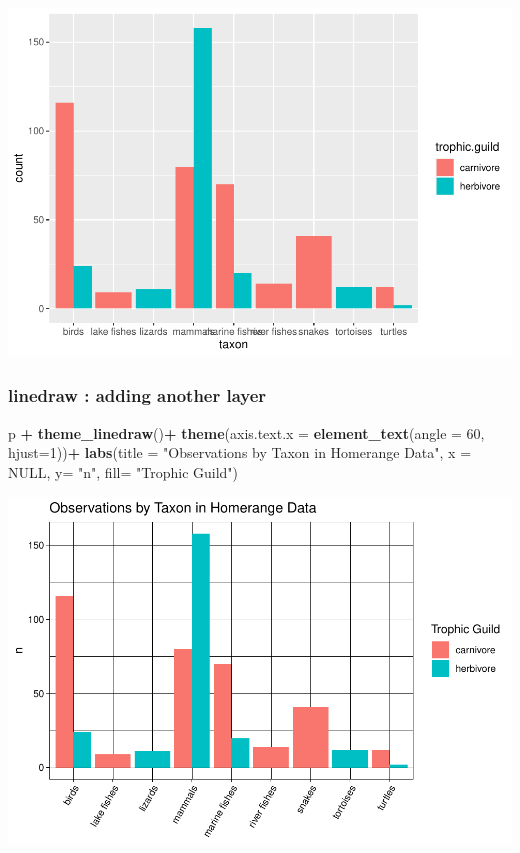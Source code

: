 \documentclass[
]{article}
\newenvironment{Shaded}{\begin{snugshade}}{\end{snugshade}}
\newcommand{\AttributeTok}[1]{\textcolor[rgb]{0.13,0.29,0.53}{#1}}
\newcommand{\ConstantTok}[1]{\textcolor[rgb]{0.56,0.35,0.01}{#1}}
\newcommand{\DecValTok}[1]{\textcolor[rgb]{0.00,0.00,0.81}{#1}}
\newcommand{\FunctionTok}[1]{\textcolor[rgb]{0.13,0.29,0.53}{\textbf{#1}}}
\newcommand{\NormalTok}[1]{#1}
\newcommand{\SpecialCharTok}[1]{\textcolor[rgb]{0.81,0.36,0.00}{\textbf{#1}}}
\newcommand{\StringTok}[1]{\textcolor[rgb]{0.31,0.60,0.02}{#1}}
\begin{document}
\includegraphics{Untitled_files/figure-latex/unnamed-chunk-39-1.pdf}

\hypertarget{linedraw-adding-another-layer}{%
\subsubsection{linedraw : adding another
layer}\label{linedraw-adding-another-layer}}

\begin{Shaded}
\begin{Highlighting}[]
\NormalTok{p }\SpecialCharTok{+} \FunctionTok{theme\_linedraw}\NormalTok{()}\SpecialCharTok{+}
  \FunctionTok{theme}\NormalTok{(}\AttributeTok{axis.text.x =} \FunctionTok{element\_text}\NormalTok{(}\AttributeTok{angle =} \DecValTok{60}\NormalTok{, }\AttributeTok{hjust=}\DecValTok{1}\NormalTok{))}\SpecialCharTok{+}
  \FunctionTok{labs}\NormalTok{(}\AttributeTok{title =} \StringTok{"Observations by Taxon in Homerange Data"}\NormalTok{,}
       \AttributeTok{x =} \ConstantTok{NULL}\NormalTok{,}
       \AttributeTok{y=} \StringTok{"n"}\NormalTok{,}
       \AttributeTok{fill=} \StringTok{"Trophic Guild"}\NormalTok{)}
\end{Highlighting}
\end{Shaded}

\includegraphics{Untitled_files/figure-latex/unnamed-chunk-40-1.pdf}
\end{document}

